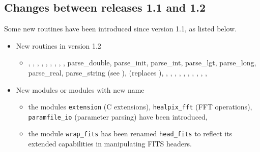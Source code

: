 \documentclass[12pt,twoside]{article}
\begin{document}
{\begin{itemize}
\end{itemize}

\subsection{Changes between releases 1.1 and 1.2}
Some new routines have been introduced since version 1.1, as listed below.

\begin{itemize}
\item New routines in version 1.2
\begin{itemize}
\item {}, 
, 
, 
, 
, 
, 
, 
, 
, 
parse\_double, parse\_init, parse\_int, parse\_lgt, parse\_long, parse\_real, parse\_string (see ), 
 (replaces ), 
, 
, 
, 
, 
, 
, 
, 
, 
, 
, 
\end{itemize}

\item New modules or modules with new name
\begin{itemize}
\item the modules {\tt extension} (C extensions), {\tt healpix\_fft} (FFT
operations), {\tt paramfile\_io} (parameter parsing) have
been introduced,
\item the module {\tt wrap\_fits} has been renamed {\tt head\_fits} to
reflect its extended capabilities in manipulating FITS headers.
\end{itemize}


\end{itemize}}
\end{document}
